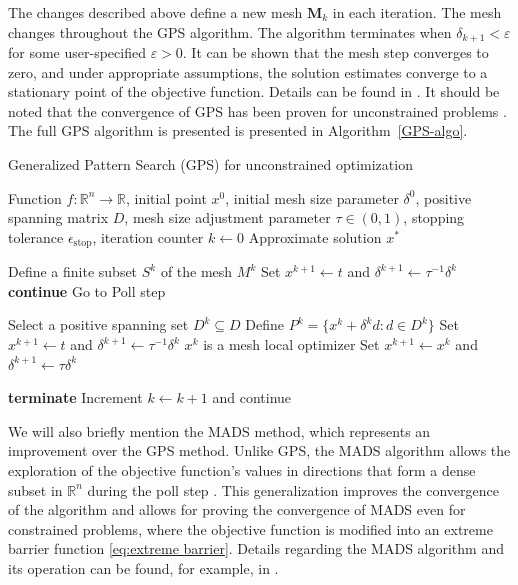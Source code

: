 The changes described above define a new mesh $ \mathbf{M} _k $ in each iteration. The mesh changes throughout the GPS algorithm. The algorithm terminates when $ \delta_{k+1} < \varepsilon $ for some user-specified $ \varepsilon > 0 $. It can be shown that the mesh step converges to zero, and under appropriate assumptions, the solution estimates converge to a stationary point of the objective function. Details can be found in \cite{BBO-textbook}. It should be noted that the convergence of GPS has been proven for unconstrained problems \cite{BBO-textbook}. The full GPS algorithm is presented is presented in Algorithm~\ref{GPS-algo}.
\\[4pt]
\begin{algorithm}[H]
	\caption{Generalized Pattern Search (GPS) for unconstrained optimization}\label{GPS-algo}
	\begin{algorithmic}[1]
		\Require Function $f: \mathbb{R}^n \to \mathbb{R}$, initial point $x^0$, initial mesh size parameter $\delta^0$, positive spanning matrix $D$, mesh size adjustment parameter $\tau \in (0, 1)$, stopping tolerance $\epsilon_{\text{stop}}$, iteration counter $k \gets 0$
		\Ensure Approximate solution $x^*$
		
		
		
		\State Define a finite subset $S^k$ of the mesh $M^k$
		\State Set $x^{k+1} \gets t$ and $\delta^{k+1} \gets \tau^{-1} \delta^k$
		\State \textbf{continue}
		\Else
		\State Go to Poll step
		\EndIf
		
		\State Select a positive spanning set $D^k \subseteq D$
		\State Define $P^k = \{x^k + \delta^k d : d \in D^k\}$
		\State Set $x^{k+1} \gets t$ and $\delta^{k+1} \gets \tau^{-1} \delta^k$
		\Else
		\State $x^k$ is a mesh local optimizer
		\State Set $x^{k+1} \gets x^k$ and $\delta^{k+1} \gets \tau \delta^k$
		\EndIf
		
		\State \textbf{terminate}
		\Else
		\State Increment $k \gets k+1$ and continue
		\EndIf
		
		\EndWhile
		\EndProcedure
	\end{algorithmic}
\end{algorithm}

We will also briefly mention the MADS method, which represents an improvement over the GPS method. Unlike GPS, the MADS algorithm allows the exploration of the objective function's values in directions that form a dense subset in $ \mathbb{R}^{n} $ during the poll step \cite{BBO-textbook, derivative-free-review}. This generalization improves the convergence of the algorithm and allows for proving the convergence of MADS even for constrained problems, where the objective function is modified into an extreme barrier function \ref{eq:extreme barrier}. Details regarding the MADS algorithm and its operation can be found, for example, in \cite{BBO-textbook}.


